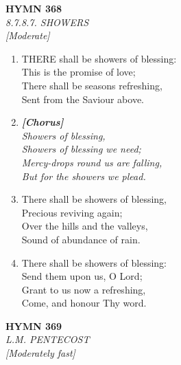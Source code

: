 \newpage
\begin{center}
    {\Large \textbf{HYMN 368}}
    \\
    \textit{8.7.8.7. SHOWERS}
    \\
    \textit{\small [Moderate]}
\end{center}
\vspace{1em}

\begin{enumerate}
    \item THERE shall be showers of blessing: \\
        This is the promise of love; \\
        There shall be seasons refreshing, \\
        Sent from the Saviour above.

    \item[] \vspace{0.4em}
    \textbf{\textit{[Chorus]}} \\
    \textit{Showers of blessing,} \\
    \textit{Showers of blessing we need;} \\
    \textit{Mercy-drops round us are falling,} \\
    \textit{But for the showers we plead.}
    \vspace{0.4em}

    \item There shall be showers of blessing, \\
        Precious reviving again; \\
        Over the hills and the valleys, \\
        Sound of abundance of rain.

    \item There shall be showers of blessing: \\
        Send them upon us, O Lord; \\
        Grant to us now a refreshing, \\
        Come, and honour Thy word.

\end{enumerate}

\newpage
\begin{center}
    {\Large \textbf{HYMN 369}}
    \\
    \textit{L.M. PENTECOST}
    \\
    \textit{\small [Moderately fast]}
\end{center}
\vspace{1em}

